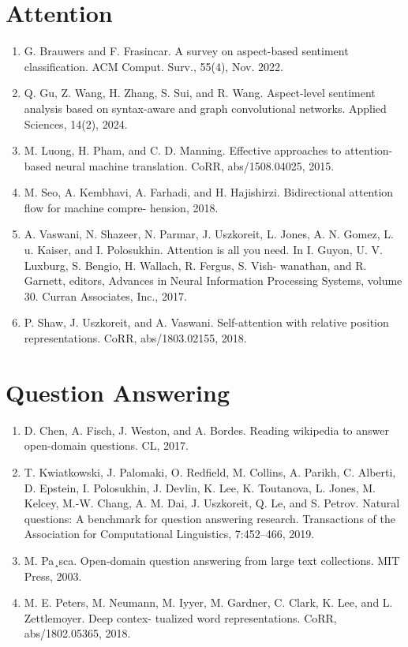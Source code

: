 \documentclass[]{article}
\begin{document}
\section{Attention}
\begin{enumerate}
\item G. Brauwers and F. Frasincar. A survey on aspect-based sentiment classification. ACM Comput. Surv.,
55(4), Nov. 2022.
\item Q. Gu, Z. Wang, H. Zhang, S. Sui, and R. Wang. Aspect-level sentiment analysis based on syntax-aware
and graph convolutional networks. Applied Sciences, 14(2), 2024.
\item M. Luong, H. Pham, and C. D. Manning. Effective approaches to attention-based neural machine
translation. CoRR, abs/1508.04025, 2015.
\item M. Seo, A. Kembhavi, A. Farhadi, and H. Hajishirzi. Bidirectional attention flow for machine compre-
hension, 2018.
\item A. Vaswani, N. Shazeer, N. Parmar, J. Uszkoreit, L. Jones, A. N. Gomez, L. u. Kaiser, and I. Polosukhin.
Attention is all you need. In I. Guyon, U. V. Luxburg, S. Bengio, H. Wallach, R. Fergus, S. Vish-
wanathan, and R. Garnett, editors, Advances in Neural Information Processing Systems, volume 30.
Curran Associates, Inc., 2017.
\item  P. Shaw, J. Uszkoreit, and A. Vaswani. Self-attention with relative position representations. CoRR,
abs/1803.02155, 2018.
\end{enumerate}

\section{Question Answering}
\begin{enumerate}
\item D. Chen, A. Fisch, J. Weston, and A. Bordes. Reading wikipedia to answer open-domain questions. CL,
2017.
\item T. Kwiatkowski, J. Palomaki, O. Redfield, M. Collins, A. Parikh, C. Alberti, D. Epstein, I. Polosukhin,
J. Devlin, K. Lee, K. Toutanova, L. Jones, M. Kelcey, M.-W. Chang, A. M. Dai, J. Uszkoreit, Q. Le,
and S. Petrov. Natural questions: A benchmark for question answering research. Transactions of the
Association for Computational Linguistics, 7:452–466, 2019.
\item M. Pa¸sca. Open-domain question answering from large text collections. MIT Press, 2003.
\item M. E. Peters, M. Neumann, M. Iyyer, M. Gardner, C. Clark, K. Lee, and L. Zettlemoyer. Deep contex-
tualized word representations. CoRR, abs/1802.05365, 2018.
\end{enumerate}
\end{document}
